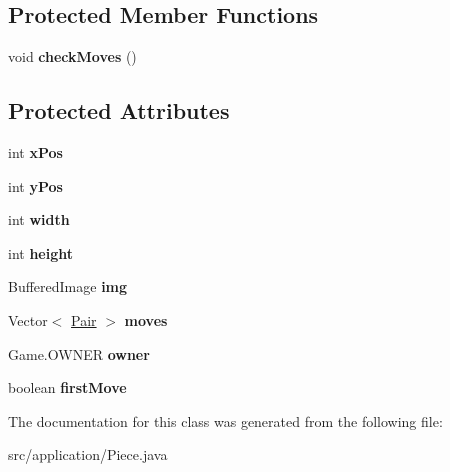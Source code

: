 \subsection*{Protected Member Functions}
\begin{DoxyCompactItemize}
\item 
\hypertarget{classapplication_1_1_piece_a70d0ea8dfe2d8ebaf1af52f3468cf972}{void {\bfseries check\+Moves} ()}\label{classapplication_1_1_piece_a70d0ea8dfe2d8ebaf1af52f3468cf972}

\end{DoxyCompactItemize}
\subsection*{Protected Attributes}
\begin{DoxyCompactItemize}
\item 
\hypertarget{classapplication_1_1_piece_af7a78ee6a0bbbee54b0bf385ab3eda43}{int {\bfseries x\+Pos}}\label{classapplication_1_1_piece_af7a78ee6a0bbbee54b0bf385ab3eda43}

\item 
\hypertarget{classapplication_1_1_piece_a11da2d0872e6553217daa56a851c7740}{int {\bfseries y\+Pos}}\label{classapplication_1_1_piece_a11da2d0872e6553217daa56a851c7740}

\item 
\hypertarget{classapplication_1_1_piece_a8885ca50301c6e85d333f397ad106a6b}{int {\bfseries width}}\label{classapplication_1_1_piece_a8885ca50301c6e85d333f397ad106a6b}

\item 
\hypertarget{classapplication_1_1_piece_af7f74a095a34bf775cc6b44e5ea1dcbe}{int {\bfseries height}}\label{classapplication_1_1_piece_af7f74a095a34bf775cc6b44e5ea1dcbe}

\item 
\hypertarget{classapplication_1_1_piece_a423e3460410ce4199060a42812c79463}{Buffered\+Image {\bfseries img}}\label{classapplication_1_1_piece_a423e3460410ce4199060a42812c79463}

\item 
\hypertarget{classapplication_1_1_piece_a9e704a1ebc750f4a5f1c640f1cc927f4}{Vector$<$ \hyperlink{classapplication_1_1_pair}{Pair} $>$ {\bfseries moves}}\label{classapplication_1_1_piece_a9e704a1ebc750f4a5f1c640f1cc927f4}

\item 
\hypertarget{classapplication_1_1_piece_a724f116bd99a66a6f6bcc8b7b35de131}{Game.\+O\+W\+N\+E\+R {\bfseries owner}}\label{classapplication_1_1_piece_a724f116bd99a66a6f6bcc8b7b35de131}

\item 
\hypertarget{classapplication_1_1_piece_a8610c3152130255360304aabb534e7cb}{boolean {\bfseries first\+Move}}\label{classapplication_1_1_piece_a8610c3152130255360304aabb534e7cb}

\end{DoxyCompactItemize}


The documentation for this class was generated from the following file\+:\begin{DoxyCompactItemize}
\item 
src/application/Piece.\+java\end{DoxyCompactItemize}
